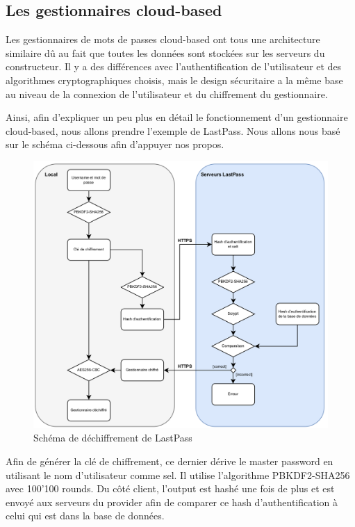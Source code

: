 \subsection{Les gestionnaires cloud-based}
Les gestionnaires de mots de passes cloud-based ont tous une architecture similaire dû au fait que toutes les données sont stockées sur les serveurs du constructeur. Il y a des différences avec l'authentification de l'utilisateur et des algorithmes cryptographiques choisis, mais le design sécuritaire a la même base au niveau de la connexion de l'utilisateur et du chiffrement du gestionnaire. 

Ainsi, afin d'expliquer un peu plus en détail le fonctionnement d'un gestionnaire cloud-based, nous allons prendre l'exemple de LastPass. Nous allons nous basé sur le schéma ci-dessous afin d'appuyer nos propos.
\begin{figure}[h!]
	\includegraphics[width=15.5cm]{images/lastpass_encr.png}
	\centering
	\caption{Schéma de déchiffrement de LastPass}
\end{figure}

Afin de générer la clé de chiffrement, ce dernier dérive le master password en utilisant le nom d'utilisateur comme sel. Il utilise l'algorithme PBKDF2-SHA256 avec 100'100 rounds. Du côté client, l'output est hashé une fois de plus et est envoyé aux serveurs du provider afin de comparer ce hash d'authentification à celui qui est dans la base de données.

